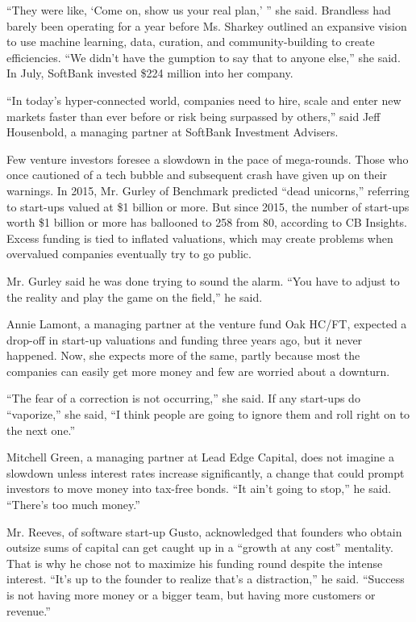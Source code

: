 ``They were like, `Come on, show us your real plan,' '' she said.
Brandless had barely been operating for a year before Ms. Sharkey
outlined an expansive vision to use machine learning, data, curation,
and community-building to create efficiencies. ``We didn't have the
gumption to say that to anyone else,'' she said. In July, SoftBank
invested \$224 million into her company.

``In today's hyper-connected world, companies need to hire, scale and
enter new markets faster than ever before or risk being surpassed by
others,'' said Jeff Housenbold, a managing partner at SoftBank
Investment Advisers.

Few venture investors foresee a slowdown in the pace of mega-rounds.
Those who once cautioned of a tech bubble and subsequent crash have
given up on their warnings. In 2015, Mr. Gurley of Benchmark predicted
``dead unicorns,'' referring to start-ups valued at \$1 billion or more.
But since 2015, the number of start-ups worth \$1 billion or more has
ballooned to 258 from 80, according to CB Insights. Excess funding is
tied to inflated valuations, which may create problems when overvalued
companies eventually try to go public.

Mr. Gurley said he was done trying to sound the alarm. ``You have to
adjust to the reality and play the game on the field,'' he said.

Annie Lamont, a managing partner at the venture fund Oak HC/FT, expected
a drop-off in start-up valuations and funding three years ago, but it
never happened. Now, she expects more of the same, partly because most
the companies can easily get more money and few are worried about a
downturn.

``The fear of a correction is not occurring,'' she said. If any
start-ups do ``vaporize,'' she said, ``I think people are going to
ignore them and roll right on to the next one.''

Mitchell Green, a managing partner at Lead Edge Capital, does not
imagine a slowdown unless interest rates increase significantly, a
change that could prompt investors to move money into tax-free bonds.
``It ain't going to stop,'' he said. ``There's too much money.''

Mr. Reeves, of software start-up Gusto, acknowledged that founders who
obtain outsize sums of capital can get caught up in a ``growth at any
cost'' mentality. That is why he chose not to maximize his funding round
despite the intense interest. ``It's up to the founder to realize that's
a distraction,'' he said. ``Success is not having more money or a bigger
team, but having more customers or revenue.''


